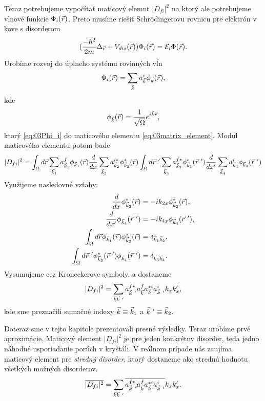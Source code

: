 Teraz potrebujeme vypočítať maticový elemnt $|D_{fi}|^2$ na ktorý ale potrebujeme vlnové funkcie $\Phi_i(\vec{r})$. Preto musíme riešiť Schr\"odingerovu rovnicu pre elektrón v kove s disorderom
\begin{align}
\label{eq:03SchrDis}
(\frac{-\hbar^2}{2m}\Delta_{\vec{r}} + V_{dis}(\vec{r}))\Phi_i(\vec{r})=\mathcal{E}_i\Phi(\vec{r})  \text{.}
\end{align}
Urobíme rozvoj do úplneho systému rovinných vĺn
\begin{align}
\label{eq:03Phi_i}
\Phi_i(\vec{r})=\sum_{\vec{k}}a^i_{\vec{k}}\phi_{\vec{k}}(\vec{r})\text{,}\\
\end{align}
kde
\begin{align}
\label{eq:03rov}
\phi_{\vec{k}}(\vec{r})=\frac{1}{\sqrt \Omega}e^{i\vec{k}\vec{r}}\text{,}
\end{align}
ktorý \eqref{eq:03Phi_i} do maticového elementu \eqref{eq:03matrix_element}. Modul maticového elementu potom bude
\begin{align}
\label{eq:03dfisquared}
|D_{fi}|^2=\int_\Omega d\vr \sum_{\vk_1}a_{\vk_1}^f\phi_{\vk_1}(\vr)\frac{d}{dx}\sum_{\vk_2}a_{\vk_2}^{i*}\phi_{\vk_2}^*(\vr)\int_\Omega d\vr\ ' \sum_{\vk_3}a_{\vk_3}^{f*}\phi_{\vk_3}^*(\vr\ ')\frac{d}{dx'}\sum_{\vk_4}a_{\vk_4}^i \phi_{\vk_4}(\vr\ ')
\end{align}
Využijeme nasledovné vzťahy:
\begin{align*}
\frac{d}{dx}\phi_{\vk_2}^*(\vr)&=-ik_{2x}\phi_{\vk_2}^*(\vr)\text{,}\\
\frac{d}{dx'}\phi_{\vk_4}(\vr\ ')&=-ik_{4x}\phi_{\vk_4}(\vr\ ')\text{,}\\
\int_\Omega d\vr \phi_{\vk_1}(\vr)\phi_{\vk_2}^*(\vr)&=\delta_{\vk_1\vk_2}\text{,}\\
\int_\Omega d\vr\ '\phi_{\vk_3}^*(\vr\ ')\phi_{\vk_4}(\vr\ ')&=\delta_{\vk_3\vk_4} \text{.}
\end{align*}
Vysumujeme cez Kroneckerove symboly, a dostaneme
\begin{align}
|D_{fi}|^2=\sum_{\vk\vk\ '} a^{f*}_{\vk\ '}a^f_{\vk}a^{*i}_{\vk}a^i_{\vk\ '}k_xk_x' \text{,}
\end{align}
kde sme preznačili sumačné indexy $\vec{k}\equiv \vec{k}_1$ a $\vec{k}\ '\equiv \vec{k}_2$.

Doteraz sme v tejto kapitole prezentovali presné výsledky. Teraz urobíme prvé aproximácie. Maticový element $|D_{fi}|^2$ je pre jeden konkrétny disorder, teda jedno náhodné usporiadanie porúch v kryštáli. V reálnom prípade nás zaujíma maticový element pre {\it stredný disorder}, ktorý dostaneme ako strednú hodnotu všetkých možných disorderov.
\begin{align}
\label{eq:03dfisq2}
\overline{|D_{fi}|^2}=\sum_{\vk\vk\ '}\overline{a^{f*}_{\vk\ '}a^f_{\vk}a^{*i}_{\vk}a^i_{\vk\ '}}k_xk_x' \text{.} 
\end{align}


